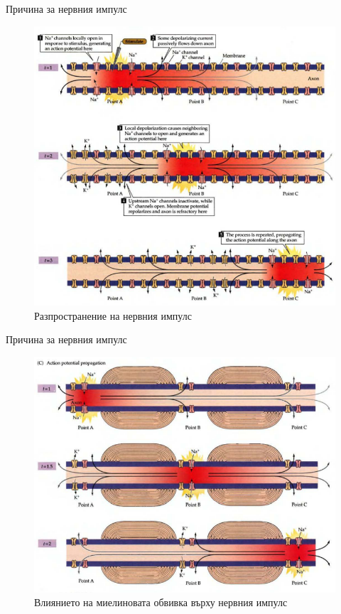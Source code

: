 \begin{frame}[t]{Причина за нервния импулс}
  \begin{figure}[htbp!]
    \centering
    \includegraphics[width=\textwidth,height=0.7\textheight,keepaspectratio]{img/axon/bare.PNG}
    \caption{Разпространение на нервния импулс \cite[Фиг 3.12]{Neuroscience}}
  \end{figure}
\end{frame}

\begin{frame}[t]{Причина за нервния импулс}
  \begin{figure}[htbp!]
    \centering
    \includegraphics[width=\textwidth,height=0.7\textheight,keepaspectratio]{img/axon/myelin.PNG}
    \caption{Влиянието на миелиновата обвивка върху нервния импулс \cite[Фиг 3.13]{Neuroscience}}
  \end{figure}
\end{frame}

